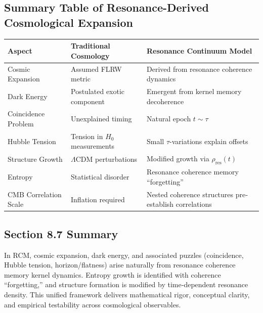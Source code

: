 \subsection{Summary Table of Resonance-Derived Cosmological Expansion}

\begin{center}
\begin{tabular}{|l|l|l|}
\hline
Aspect                            & Traditional Cosmology                   & Resonance Continuum Model                               \\ \hline
Cosmic Expansion                  & Assumed FLRW metric                     & Derived from resonance coherence dynamics               \\ \hline
Dark Energy                       & Postulated exotic component             & Emergent from kernel memory decoherence                 \\ \hline
Coincidence Problem               & Unexplained timing                     & Natural epoch \(t\sim\tau\)                             \\ \hline
Hubble Tension                    & Tension in \(H_0\) measurements         & Small \(\tau\)-variations explain offsets               \\ \hline
Structure Growth                  & \(\Lambda\)CDM perturbations           & Modified growth via \(\rho_{\mathrm{res}}(t)\)          \\ \hline
Entropy                           & Statistical disorder                    & Resonance coherence memory “forgetting”                 \\ \hline
CMB Correlation Scale             & Inflation required                      & Nested coherence structures pre‐establish correlations  \\ \hline
\end{tabular}
\end{center}

\subsection{Section 8.7 Summary}

In RCM, cosmic expansion, dark energy, and associated puzzles (coincidence, Hubble tension, horizon/flatness) arise naturally from resonance coherence memory kernel dynamics. Entropy growth is identified with coherence “forgetting,” and structure formation is modified by time‐dependent resonance density. This unified framework delivers mathematical rigor, conceptual clarity, and empirical testability across cosmological observables.

